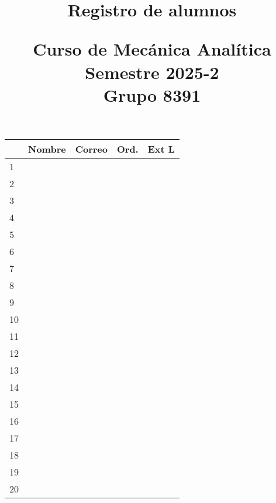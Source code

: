 \documentclass[11pt]{article}
\title{Registro de alumnos \\ \begin{large}Curso de Mecánica Analítica \\ Semestre 2025-2   \\ Grupo 8391 \end{large}}
\date{}
\author{}
\begin{document}
\maketitle

\fontsize{14}{14}\selectfont

\begin{tabular}{| l | >{\centering\arraybackslash}m{7cm}| >{\centering\arraybackslash}m{5cm} | c | c |}
\hline
 & Nombre & Correo & Ord. & Ext L \\
\hline 1 & & & & \\
\hline 2 & & & &  \\
\hline 3 & & & &  \\
\hline 4 & & & &  \\
\hline 5 & & & &  \\
\hline 6 & & & &  \\
\hline 7 & & & &  \\
\hline 8 & & & &  \\
\hline 9 & & & &  \\
\hline 10 & & & &  \\
\hline 11 & & & &  \\
\hline 12 & & & &  \\
\hline 13 & & & &  \\
\hline 14 & & & &  \\
\hline 15 & & & &  \\
\hline 16 & & & &  \\
\hline 17 & & & &  \\
\hline 18 & & & &  \\
\hline 19 & & & &  \\
\hline 20 & & & &  \\
\hline
\end{tabular}
\end{document}

